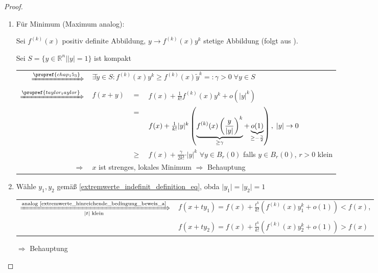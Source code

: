 \begin{proof}\hspace*{0pt}
	\begin{enumerate}[label={zu \alph*)},topsep=\dimexpr-\baselineskip / 2\relax,leftmargin=\widthof{\texttt{zu a)\ }}]
		\item {}
		Für Minimum (Maximum analog):
		
		Sei $f^{(k)}(x)$ positiv definite Abbildung, $y\to f^{(k)}(x) y^k$ stetige Abbildung (folgt aus ).
		
		Sei $S=\{ y\in\mathbb{R}^n \mid \vert y \vert = 1 \}$ ist kompakt \\
		{\renewcommand{\arraystretch}{1.5}
		\begin{tabularx}{\linewidth}{r@{\ \ }r@{\ }c@{\ }X}
		$\xRightarrow{\propref{chap_15_3}}$ & \multicolumn{3}{l}{$\exists\tilde{y}\in S: f^{(k)}(x) y^k \ge f^{(k)}(x)\tilde{y}^k =: \gamma > 0\;\forall y\in S$} \\
		$\xRightarrow{\propref{taylor_taylor}}$ & $f(x+y)$& = &$f(x) + \frac{1}{k!}f^{(k)}(x) y^k + o(\vert y\vert^k)$\\
		& & = &$f(x) + \frac{1}{k!}\vert y \vert^k \left(\underbrace{f^{(k)}(x) \left(\frac{y}{\vert y \vert}\right)^k}_{\ge \gamma} + \underbrace{o(1)}_{\mathclap{\ge -\frac{\gamma}{2}}}\right),\;\vert y \vert\to 0$ \\
		&& $\ge$ & $f(x) + \frac{\gamma}{2k!}\cdot \vert y \vert^k$ $\forall y\in B_r(0)$ falls $y\in B_r(0)$, $r>0$ klein \\
		$\Rightarrow$ &\multicolumn{3}{l}{$x$ ist strenges, lokales Minimum $\Rightarrow$ Behauptung}
		\end{tabularx}}
		
		\item Wähle $y_1, y_2$ gemäß \eqref{extremwerte_indefinit_definition_eq}, \gls{obda} $\vert y_1 \vert = \vert y_2 \vert = 1$ \\
		\begin{tabularx}{\linewidth}{r@{\ \ }X}
		$\xRightarrow[\text{$\vert t \vert$  klein}]{\text{analog \ref{extremwerte_hinreichende_bedingung_beweis_a}}}$ & $f(x + ty_1) = f(x) + \frac{t^k}{k!}\left(f^{(k)}(x) y_1^k + o(1) \right) < f(x)$, \\
		&$f(x + ty_2) = f(x) + \frac{t^k}{k!} \left( f^{(k)}(x) y_2^k + o(1) \right) > f(x)$
		\end{tabularx}
		$\Rightarrow$ Behauptung
	\end{enumerate}
\end{proof}

